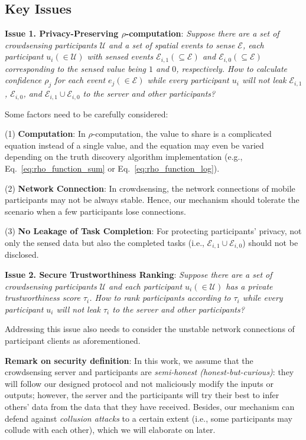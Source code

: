 \documentclass[11pt]{article}
\begin{document}
\subsection{Key Issues}

\textbf{Issue 1. Privacy-Preserving $\rho$-computation}: \textit{Suppose there are a set of crowdsensing participants $\mathcal U$ and a set of spatial events to sense $\mathcal E$, each participant $u_i (\in \mathcal U)$ with sensed events $\mathcal E_{i,1} (\subseteq \mathcal E)$ and $\mathcal E_{i,0} (\subseteq \mathcal E)$ corresponding to the sensed value being $1$ and $0$, respectively. How to calculate confidence $\rho_j$ for each event $e_j (\in \mathcal E)$ while every participant $u_i$ will not leak $\mathcal E_{i,1}$, $\mathcal E_{i,0}$, and $\mathcal E_{i,1} \cup \mathcal E_{i,0}$ to the server and other participants?}

Some factors need to be carefully considered:

(1) \textbf{Computation}: In $\rho$-computation, the value to share is a complicated equation instead of a single value, and the equation may even be varied depending on the truth discovery algorithm implementation (e.g., Eq.~\ref{eq:rho_function_sum} or Eq.~\ref{eq:rho_function_log}).

(2) \textbf{Network Connection}: In crowdsensing, the network connections of mobile participants may not be always stable. Hence, our mechanism should tolerate the scenario when a few participants lose connections.

(3) \textbf{No Leakage of Task Completion}: For protecting participants' privacy, not only the sensed data but also the completed tasks (i.e., $\mathcal E_{i,1} \cup \mathcal E_{i,0}$) should not be disclosed.

\vspace{+.5em}
\noindent \textbf{Issue 2. Secure Trustworthiness Ranking}: \textit{Suppose there are a set of crowdsensing participants $\mathcal U$ and each participant $u_i (\in \mathcal U)$ has a private trustworthiness score $\tau_i$. How to rank participants according to $\tau_i$ while every participant $u_i$ will not leak $\tau_i$ to the server and other participants?}

Addressing this issue also needs to consider the unstable network connections of participant clients as aforementioned.


\textbf{Remark on security definition}: In this work, we assume that the crowdsensing server and participants are \textit{semi-honest (honest-but-curious)}: they will follow our designed protocol and not maliciously modify the inputs or outputs; however, the server and the participants will try their best to infer others' data from the data that they have received. Besides, our mechanism can defend against \textit{collusion attacks} to a certain extent (i.e., some participants may collude with each other), which we will elaborate on later.
\end{document}
